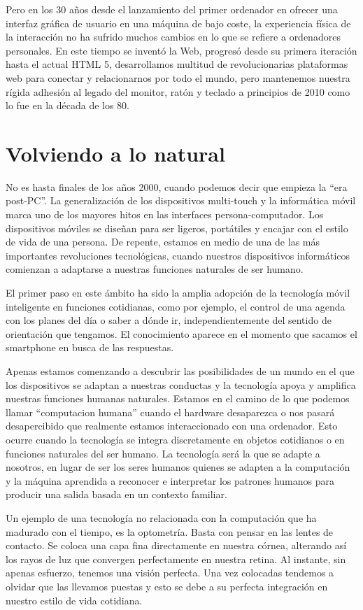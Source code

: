 Pero en los 30 años desde el lanzamiento del primer ordenador en ofrecer una interfaz gráfica de usuario en una máquina de bajo coste, la experiencia física de la interacción no ha sufrido muchos cambios en lo que se refiere a ordenadores personales. En este tiempo se inventó la Web, progresó desde su primera iteración hasta el actual HTML 5, desarrollamos multitud de revolucionarias plataformas web para conectar y relacionarnos por todo el mundo, pero mantenemos nuestra rígida adhesión al legado del monitor, ratón y teclado a principios de 2010 como lo fue en la década de los 80. 

\section{Volviendo a lo natural}
No es hasta finales de los años 2000, cuando podemos decir que empieza la ``era post-PC''. La generalización de los dispositivos multi-touch y la informática móvil marca uno de los mayores hitos en las interfaces persona-computador. Los dispositivos móviles se diseñan para ser ligeros, portátiles y encajar con el estilo de vida de una persona. De repente, estamos en medio de una de las más importantes revoluciones tecnológicas, cuando nuestros dispositivos informáticos comienzan a adaptarse a nuestras funciones naturales de ser humano.

El primer paso en este ámbito ha sido la amplia adopción de la tecnología móvil inteligente en funciones cotidianas, como por ejemplo, el control de una agenda con los planes del día o saber a dónde ir, independientemente del sentido de orientación que tengamos. El conocimiento aparece en el momento que sacamos el smartphone en busca de las respuestas.

Apenas estamos comenzando a descubrir las posibilidades de un mundo en el que los dispositivos se adaptan a nuestras conductas y la tecnología apoya y amplifica nuestras funciones humanas naturales. Estamos en el camino de lo que podemos llamar ``computacion humana'' cuando el hardware desaparezca o nos pasará desapercibido que realmente estamos interaccionado con una ordenador. Esto ocurre cuando la tecnología se integra discretamente en objetos cotidianos o en funciones naturales del ser humano. La tecnología será la que se adapte a nosotros, en lugar de ser los seres humanos quienes se adapten a la computación y la máquina aprendida a reconocer e interpretar los patrones humanos para producir una salida basada en un contexto familiar.

Un ejemplo de una tecnología no relacionada con la computación que ha madurado con el tiempo, es la optometría. Basta con pensar en las lentes de contacto. Se coloca una capa fina directamente en nuestra córnea, alterando así los rayos de luz que convergen perfectamente en nuestra retina. Al instante, sin apenas esfuerzo, tenemos una visión perfecta. Una vez colocadas tendemos a olvidar que las llevamos puestas y esto se debe a su perfecta integración en nuestro estilo de vida cotidiana. 

